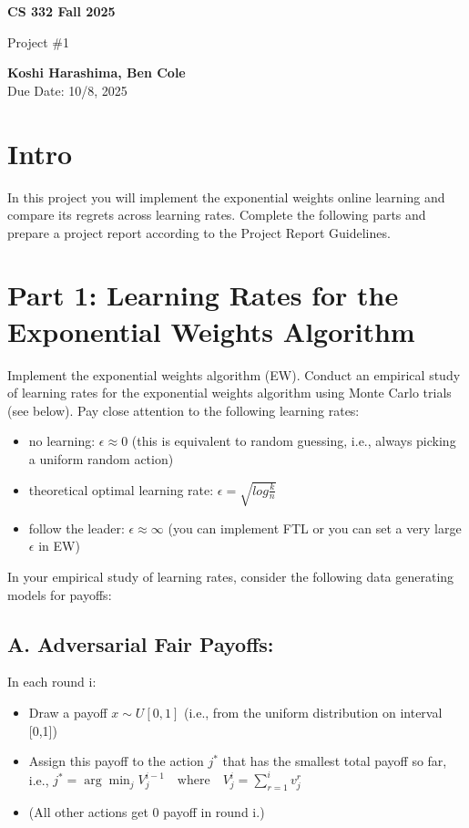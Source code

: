 \documentclass[11pt]{article}
\begin{document}
\begin{titlepage}
   \begin{center}
       \vspace*{9cm}

       \textbf{CS 332 Fall 2025}

       \vspace{0.5cm}
        Project \#1
        \vfill

       \textbf{Koshi Harashima, Ben Cole}\\
       Due Date: 10/8, 2025
            
   \end{center}
\end{titlepage}

\section*{Intro}
In this project you will implement the exponential weights online learning and compare its regrets across learning rates.
Complete the following parts and prepare a project report according to the Project Report Guidelines.  

\section*{Part 1: Learning Rates for the Exponential Weights Algorithm}
Implement the exponential weights algorithm (EW).  Conduct an empirical study of learning rates for the exponential weights algorithm using Monte Carlo trials (see below).  Pay close attention to the following learning rates:
\begin{itemize}
    \item no learning: $\epsilon \approx 0$ (this is equivalent to random guessing, i.e., always picking a uniform random action)
    \item theoretical optimal learning rate: $\epsilon = \sqrt{log\frac{k}{n}}$
    \item follow the leader: $\epsilon \approx \infty$ (you can implement FTL or you can set a very large $\epsilon$ in EW) 
\end{itemize}
In your empirical study of learning rates, consider the following data generating models for payoffs:

\vspace{1em}
\subsection*{A. Adversarial Fair Payoffs:}
In each round i:
\begin{itemize}
    \item Draw a payoff $x \sim U[0,1]$ (i.e., from the uniform distribution on interval [0,1])
    \item Assign this payoff to the action $j^*$ that has the smallest total payoff so far,\\
    i.e., $j^* = \arg\min_j V^{i-1}_{j} \quad \text{where} \quad V^{i}_{j} = \sum_{r=1}^{i} v^{r}_{j}$
    \item (All other actions get 0 payoff in round i.)
\end{itemize}
\end{document}
